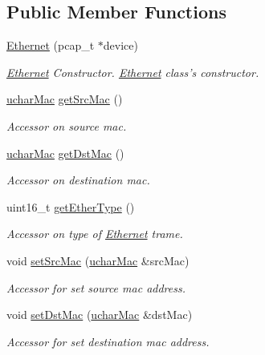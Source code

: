 \subsection*{Public Member Functions}
\begin{DoxyCompactItemize}
\item 
\hyperlink{class_ethernet_a9daff6153b76200ec40e2a539edca3ac}{Ethernet} (pcap\-\_\-t $\ast$device)
\begin{DoxyCompactList}\small\item\em \hyperlink{class_ethernet}{Ethernet} Constructor. \hyperlink{class_ethernet}{Ethernet} class's constructor. \end{DoxyCompactList}\item 
\hyperlink{structuchar_mac}{uchar\-Mac} \hyperlink{class_ethernet_a81b2d6372c9f5d4a2b8709725df8d7c7}{get\-Src\-Mac} ()
\begin{DoxyCompactList}\small\item\em Accessor on source mac. \end{DoxyCompactList}\item 
\hyperlink{structuchar_mac}{uchar\-Mac} \hyperlink{class_ethernet_ab0d4ec8d1f1f9878660cc425601fa229}{get\-Dst\-Mac} ()
\begin{DoxyCompactList}\small\item\em Accessor on destination mac. \end{DoxyCompactList}\item 
uint16\-\_\-t \hyperlink{class_ethernet_a15f9830364ed2b1197fcd2dab889440d}{get\-Ether\-Type} ()
\begin{DoxyCompactList}\small\item\em Accessor on type of \hyperlink{class_ethernet}{Ethernet} trame. \end{DoxyCompactList}\item 
void \hyperlink{class_ethernet_ad36895e50904c982627f489e3a870b18}{set\-Src\-Mac} (\hyperlink{structuchar_mac}{uchar\-Mac} \&src\-Mac)
\begin{DoxyCompactList}\small\item\em Accessor for set source mac address. \end{DoxyCompactList}\item 
void \hyperlink{class_ethernet_a9d7ea3ce550d82ce0cd1d60b64a96c9c}{set\-Dst\-Mac} (\hyperlink{structuchar_mac}{uchar\-Mac} \&dst\-Mac)
\begin{DoxyCompactList}\small\item\em Accessor for set destination mac address. \end{DoxyCompactList}\item 

\end{DoxyCompactItemize}
